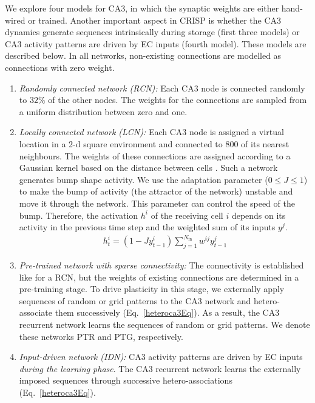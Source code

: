\documentclass[utf8]{frontiersSCNS} %
\begin{document}
We explore four models for CA3, in which the synaptic weights are either hand-wired or trained. Another important aspect in CRISP is whether the CA3 dynamics generate sequences intrinsically during storage (first three models) or CA3 activity patterns are driven by EC inputs (fourth model). These models are described below.
In all networks, non-existing connections are modelled as connections with zero weight.

\begin{enumerate}
\item \textit{Randomly connected network (RCN):} Each CA3 node is connected randomly to $32\%$ of the other nodes. The weights for the connections are sampled from a uniform distribution between zero and one. 

\item \textit{Locally connected network (LCN):} Each CA3 node is assigned a virtual location in a 2-d square environment and connected to $800$ of its nearest neighbours. The weights of these connections are assigned according to a Gaussian kernel based on the distance between cells \cite{azizi2013computational}. 
Such a network generates bump shape activity. We use the adaptation parameter ($0 \leq J \leq 1$) to make the bump of activity (the attractor of the network) unstable and move it through the network. This parameter can control the speed of the bump. 
Therefore, the activation $h^i$ of the receiving cell $i$ depends on its activity in the previous time step and the weighted sum of its inputs $y^j$.
\begin{align}
\label{eq:adaptation}
h^{i}_{t} = (1 - J y^{i}_{t-1}) \sum_{j = 1}^{N_\mathrm{in}} {{w^{ij} y^{j}_{t-1}}}
\end{align}

\item \textit{Pre-trained network with sparse connectivity:} The connectivity is established like for a RCN, but the weights of existing connections are determined in a pre-training stage. To drive plasticity in this stage, we externally apply sequences of random or grid patterns to the CA3 network and hetero-associate them successively (Eq.~\ref{heteroca3Eq}). As a result, the CA3 recurrent network learns the sequences of random or grid patterns. We denote these networks PTR and PTG, respectively.
\item \textit{Input-driven network (IDN):} CA3 activity patterns are driven by EC inputs \textit{during the learning phase}. The CA3 recurrent network learns the externally imposed sequences through successive hetero-associations (Eq.~\ref{heteroca3Eq}).
\end{enumerate}
\end{document}
